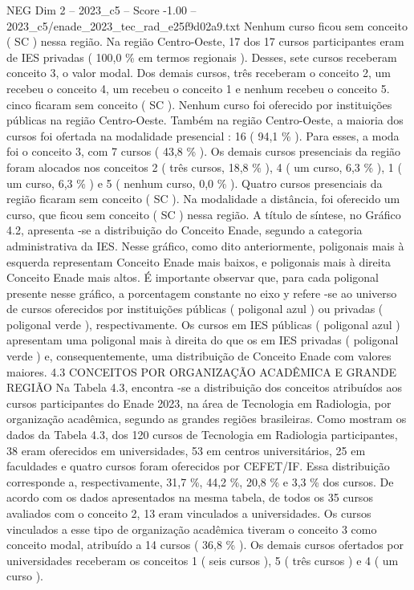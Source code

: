 \begin{textsample}{NEG Dim 2 – 2023\_c5 – Score -1.00 – 2023\_c5/enade\_2023\_tec\_rad\_e25f9d02a9.txt}
Nenhum curso ficou sem conceito ( SC ) nessa região.
Na região Centro-Oeste, 17 dos 17 cursos participantes eram de IES privadas ( 100,0 \% em termos regionais ).
Desses, sete cursos receberam conceito 3, o valor modal.
Dos demais cursos, três receberam o conceito 2, um recebeu o conceito 4, um recebeu o conceito 1 e nenhum recebeu o conceito 5. cinco ficaram sem conceito ( SC ).
Nenhum curso foi oferecido por instituições públicas na região Centro-Oeste.
Também na região Centro-Oeste, a maioria dos cursos foi ofertada na modalidade presencial : 16 ( 94,1 \% ).
Para esses, a moda foi o conceito 3, com 7 cursos ( 43,8 \% ).
Os demais cursos presenciais da região foram alocados nos conceitos 2 ( três cursos, 18,8 \% ), 4 ( um curso, 6,3 \% ), 1 ( um curso, 6,3 \% ) e 5 ( nenhum curso, 0,0 \% ).
Quatro cursos presenciais da região ficaram sem conceito ( SC ).
Na modalidade a distância, foi oferecido um curso, que ficou sem conceito ( SC ) nessa região.
A título de síntese, no Gráfico 4.2, apresenta -se a distribuição do Conceito Enade, segundo a categoria administrativa da IES.
Nesse gráfico, como dito anteriormente, poligonais mais à esquerda representam Conceito Enade mais baixos, e poligonais mais à direita Conceito Enade mais altos.
É importante observar que, para cada poligonal presente nesse gráfico, a porcentagem constante no eixo y refere -se ao universo de cursos oferecidos por instituições públicas ( poligonal azul ) ou privadas ( poligonal verde ), respectivamente.
Os cursos em IES públicas ( poligonal azul ) apresentam uma poligonal mais à direita do que os em IES privadas ( poligonal verde ) e, consequentemente, uma distribuição de Conceito Enade com valores maiores. 4.3 CONCEITOS POR ORGANIZAÇÃO ACADÊMICA E GRANDE REGIÃO Na Tabela 4.3, encontra -se a distribuição dos conceitos atribuídos aos cursos participantes do Enade 2023, na área de Tecnologia em Radiologia, por organização acadêmica, segundo as grandes regiões brasileiras.
Como mostram os dados da Tabela 4.3, dos 120 cursos de Tecnologia em Radiologia participantes, 38 eram oferecidos em universidades, 53 em centros universitários, 25 em faculdades e quatro cursos foram oferecidos por CEFET/IF.
Essa distribuição corresponde a, respectivamente, 31,7 \%, 44,2 \%, 20,8 \% e 3,3 \% dos cursos.
De acordo com os dados apresentados na mesma tabela, de todos os 35 cursos avaliados com o conceito 2, 13 eram vinculados a universidades.
Os cursos vinculados a esse tipo de organização acadêmica tiveram o conceito 3 como conceito modal, atribuído a 14 cursos ( 36,8 \% ).
Os demais cursos ofertados por universidades receberam os conceitos 1 ( seis cursos ), 5 ( três cursos ) e 4 ( um curso ).

\end{textsample}
